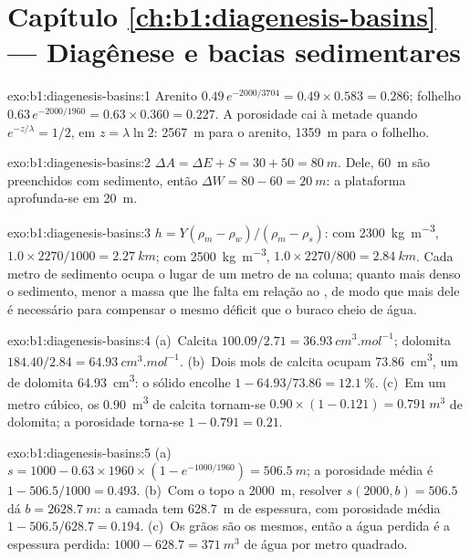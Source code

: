 \section*{Capítulo \ref{ch:b1:diagenesis-basins} --- Diagênese e bacias sedimentares}

\begin{solution}{exo:b1:diagenesis-basins:1}
Arenito $0.49\,e^{-2000/3704} = 0.49\times0.583 = \num{0.286}$; folhelho
$0.63\,e^{-2000/1960} = 0.63\times0.360 = \num{0.227}$. A porosidade cai à metade quando
$e^{-z/\lambda} = 1/2$, em $z = \lambda\ln 2$: \qty{2567}{m} para o arenito,
\qty{1359}{m} para o folhelho.
\end{solution}

\begin{solution}{exo:b1:diagenesis-basins:2}
$\Delta A = \Delta E + S = 30 + 50 = \qty{80}{m}$. Dele, \qty{60}{m} são preenchidos com
sedimento, então $\Delta W = 80 - 60 = \qty{20}{m}$: a plataforma aprofunda-se em
\qty{20}{m}.
\end{solution}

\begin{solution}{exo:b1:diagenesis-basins:3}
$h = Y(\rho_m - \rho_w)/(\rho_m - \rho_s)$: com \qty{2300}{kg.m^{-3}},
$1.0\times2270/1000 = \qty{2.27}{km}$; com \qty{2500}{kg.m^{-3}},
$1.0\times2270/800 = \qty{2.84}{km}$. Cada metro de sedimento ocupa o lugar de um metro de
 na coluna; quanto mais denso o sedimento, menor a massa que lhe falta em relação ao
, de modo que mais dele é necessário para compensar o mesmo déficit que o buraco
cheio de água.
\end{solution}

\begin{solution}{exo:b1:diagenesis-basins:4}
(a)~Calcita $100.09/2.71 = \qty{36.93}{cm^3.mol^{-1}}$; dolomita $184.40/2.84
= \qty{64.93}{cm^3.mol^{-1}}$. (b)~Dois mols de calcita ocupam
\qty{73.86}{cm^3}, um de dolomita \qty{64.93}{cm^3}: o sólido encolhe
$1 - 64.93/73.86 = \qty{12.1}{\%}$. (c)~Em um metro cúbico, os \qty{0.90}{m^3}
de calcita tornam-se $0.90\times(1 - 0.121) = \qty{0.791}{m^3}$ de dolomita; a
porosidade torna-se $1 - 0.791 = \num{0.21}$.
\end{solution}

\begin{solution}{exo:b1:diagenesis-basins:5}
(a)~$s = 1000 - 0.63\times1960\times(1 - e^{-1000/1960}) = \qty{506.5}{m}$; a
porosidade média é $1 - 506.5/1000 = \num{0.493}$. (b)~Com o topo a
\qty{2000}{m}, resolver $s(2000, b) = 506.5$ dá $b = \qty{2628.7}{m}$: a
camada tem \qty{628.7}{m} de espessura, com porosidade média $1 - 506.5/628.7 = \num{0.194}$.
(c)~Os grãos são os mesmos, então a água perdida é a espessura perdida:
$1000 - 628.7 = \qty{371}{m^3}$ de água por metro quadrado.
\end{solution}

